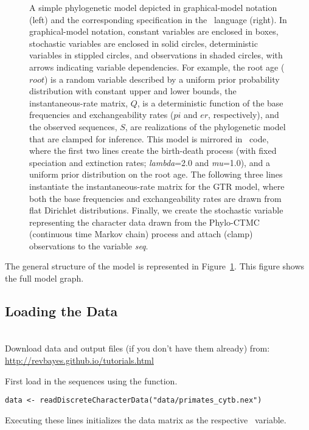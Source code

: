 \begin{figure}[h!]
\centering
{}
\caption{\small A simple phylogenetic model depicted in graphical-model notation (left) and the corresponding specification in the \Rev~language (right).
In graphical-model notation, constant variables are enclosed in boxes, stochastic variables are enclosed in solid circles, deterministic variables in stippled circles, and observations in shaded circles, with arrows indicating variable dependencies. 
For example, the root age ($root$) is a random variable described by a uniform prior probability distribution with constant upper and lower bounds, the instantaneous-rate matrix, $Q$, is a deterministic function of the base frequencies and exchangeability rates ($pi$ and $er$, respectively), and the observed sequences, $S$, are realizations of the phylogenetic model that are clamped for inference. 
This model is mirrored in \Rev~code, where the first two lines create the birth-death process (with fixed speciation and extinction rates; \emph{lambda}=2.0 and \emph{mu}=1.0), and a uniform prior distribution on the root age. 
The following three lines instantiate the instantaneous-rate matrix for the GTR model, where both the base frequencies and exchangeability rates are drawn from flat Dirichlet distributions.
Finally, we create the stochastic variable representing the character data drawn from the Phylo-CTMC (continuous time Markov chain) process and attach (clamp) observations to the variable \emph{seq}.}
\label{fig:clock_prior}
\end{figure}

The general structure of the model is represented in Figure~\ref{fig:clock_prior}.
This figure shows the full model graph.


\bigskip

\subsection{Loading the Data}

\noindent \\ \impmark Download data and output files (if you don't have them already) from: \href{http://revbayes.github.io/tutorials.html}{http://revbayes.github.io/tutorials.html}

First load in the sequences using the  function. 
{\tt \begin{snugshade*}
\begin{lstlisting}
data <- readDiscreteCharacterData("data/primates_cytb.nex")
\end{lstlisting}
\end{snugshade*}}
Executing these lines initializes the data matrix as the respective \Rev~variable. 

